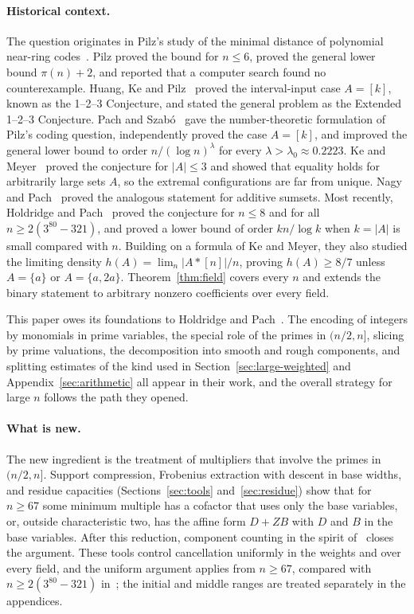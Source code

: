\documentclass[11pt]{article}
\numberwithin{equation}{section}
\theoremstyle{definition}\newtheorem{definition}[theorem]{Definition}
\theoremstyle{remark}\newtheorem{remark}[theorem]{Remark}
\begin{document}
\paragraph{Historical context.}
The question originates in Pilz's study of the minimal distance of
polynomial near-ring codes~\cite{Pilz}. Pilz proved the bound for
$n\le6$, proved the general lower bound $\pi(n)+2$, and reported that a
computer search found no counterexample.
Huang, Ke and Pilz~\cite{HKP} proved the interval-input case $A=[k]$,
known as the 1--2--3 Conjecture, and stated the general problem as the
Extended 1--2--3 Conjecture. Pach and Szab\'o~\cite{PS} gave the
number-theoretic formulation of Pilz's coding question, independently
proved the case $A=[k]$, and improved the general lower bound to
order $n/(\log n)^{\lambda}$ for every $\lambda>\lambda_0\approx0.2223$.
Ke and Meyer~\cite{KM} proved the conjecture for $|A|\le3$ and showed
that equality holds for arbitrarily large sets $A$, so the extremal
configurations are far from unique. Nagy and Pach~\cite{NP} proved the
analogous statement for additive sumsets. Most recently, Holdridge and
Pach~\cite{HP} proved the conjecture for $n\le8$ and for all
$n\ge2(3^{80}-321)$, and proved a lower bound of order $kn/\log k$ when
$k=|A|$ is small compared with $n$. Building on a formula of Ke and
Meyer, they also studied the limiting density
$h(A)=\lim_n|A*[n]|/n$, proving $h(A)\ge8/7$ unless $A=\{a\}$ or
$A=\{a,2a\}$. Theorem~\ref{thm:field} covers every $n$ and extends the
binary statement to arbitrary nonzero coefficients over every field.

This paper owes its foundations to Holdridge and Pach~\cite{HP}. The
encoding of integers by monomials in prime variables, the special role of
the primes in $(n/2,n]$, slicing by prime valuations, the decomposition
into smooth and rough components, and splitting estimates of the kind
used in Section~\ref{sec:large-weighted} and Appendix~\ref{sec:arithmetic}
all appear in their work, and the overall strategy for large $n$ follows
the path they opened.

\paragraph{What is new.}
The new ingredient is the treatment of multipliers that involve the
primes in $(n/2,n]$. Support compression, Frobenius extraction with
descent in base widths, and residue capacities (Sections~\ref{sec:tools}
and~\ref{sec:residue}) show that for $n\ge67$ some minimum multiple has a
cofactor that uses only the base variables, or, outside characteristic
two, has the affine form $D+ZB$ with $D$ and $B$ in the base variables.
After this reduction, component counting in the spirit of~\cite{HP}
closes the argument. These tools control cancellation uniformly in the
weights and over every field, and the uniform argument applies from
$n\ge67$, compared with $n\ge2(3^{80}-321)$ in~\cite{HP}; the
initial and middle ranges are treated separately in the appendices.
\end{document}
